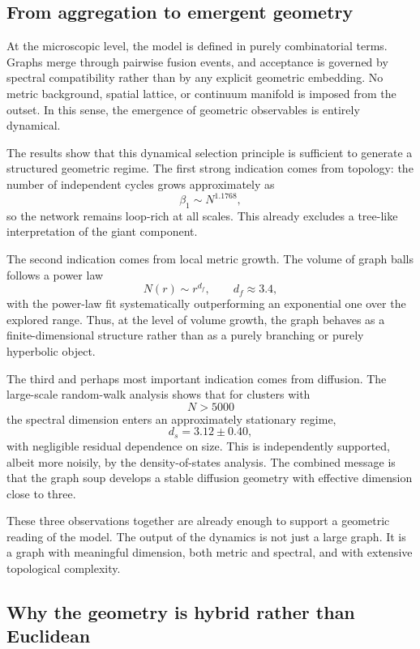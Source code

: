 \documentclass[11pt]{article}
\begin{document}
\subsection{From aggregation to emergent geometry}

At the microscopic level, the model is defined in purely combinatorial terms.
Graphs merge through pairwise fusion events, and acceptance is governed by spectral compatibility rather than by any explicit geometric embedding.
No metric background, spatial lattice, or continuum manifold is imposed from the outset.
In this sense, the emergence of geometric observables is entirely dynamical.

The results show that this dynamical selection principle is sufficient to generate a structured geometric regime.
The first strong indication comes from topology:
the number of independent cycles grows approximately as
\[
\beta_1 \sim N^{1.1768},
\]
so the network remains loop-rich at all scales.
This already excludes a tree-like interpretation of the giant component.

The second indication comes from local metric growth.
The volume of graph balls follows a power law
\[
N(r)\sim r^{d_f},
\qquad
d_f \approx 3.4,
\]
with the power-law fit systematically outperforming an exponential one over the explored range.
Thus, at the level of volume growth, the graph behaves as a finite-dimensional structure rather than as a purely branching or purely hyperbolic object.

The third and perhaps most important indication comes from diffusion.
The large-scale random-walk analysis shows that for clusters with
\[
N>5000
\]
the spectral dimension enters an approximately stationary regime,
\[
d_s = 3.12 \pm 0.40,
\]
with negligible residual dependence on size.
This is independently supported, albeit more noisily, by the density-of-states analysis.
The combined message is that the graph soup develops a stable diffusion geometry with effective dimension close to three.

These three observations together are already enough to support a geometric reading of the model.
The output of the dynamics is not just a large graph.
It is a graph with meaningful dimension, both metric and spectral, and with extensive topological complexity.

\subsection{Why the geometry is hybrid rather than Euclidean}
\end{document}
